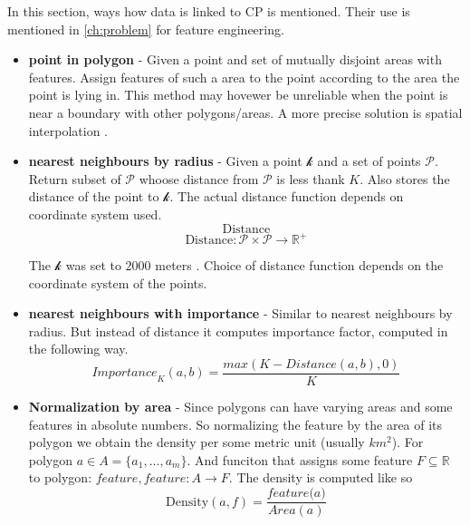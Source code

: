 In this section, ways how data is linked to \acrlong{CP} is mentioned. Their use is mentioned in \ref{ch:problem} for feature engineering.

\begin{itemize}
    \item[] \textbf{point in polygon} - Given a point and set of mutually disjoint areas with features. Assign features of such a area to the point according to the area the point is lying in. This method may hovewer be unreliable when the point is near a boundary with other polygons/areas. A more precise solution is spatial interpolation .
    \item[] \textbf{nearest neighbours by radius} - Given a point $\mathcal{k}$ and a set of points $\mathcal{P}$. Return subset of $\mathcal{P}$  whoose distance from $\mathcal{P}$ is less thank $K$. Also stores the distance of the point to $\mathcal{k}$. The actual distance function depends on coordinate system used.
          \[ \text{Distance}  \]
          \[\text{Distance}: \mathcal{P} \times \mathcal{P} \rightarrow \mathbb{R}^+  \]

          The $\mathcal{k}$ was set to $2000$ meters . Choice of distance function depends on the coordinate system of the points.
    \item[] \textbf{nearest neighbours with importance} - Similar to nearest neighbours by radius. But instead of distance it computes importance factor, computed in the following way.
          \[
              \textit{Importance}_K(a,b) = \frac{max( K - \textit{Distance}(a,b) ,0)}{K}
          \]


    \item[] \textbf{Normalization by area} - Since polygons can have varying areas and some features in absolute numbers. So normalizing the feature by the area of its polygon we obtain the density per some metric unit (usually $km^2$). For polygon $a \in A = \{a_1, \dots , a_m\}$. And funciton that assigns some feature $F \subseteq \mathbb{R}$  to polygon: $\textit{feature}, \textit{feature}: A \rightarrow F$. The density is computed like so
          \[ \text{Density}(a,f) = \frac{\textit{feature(a)}}{\textit{Area}(a)} \]
          \[\]

\end{itemize}
